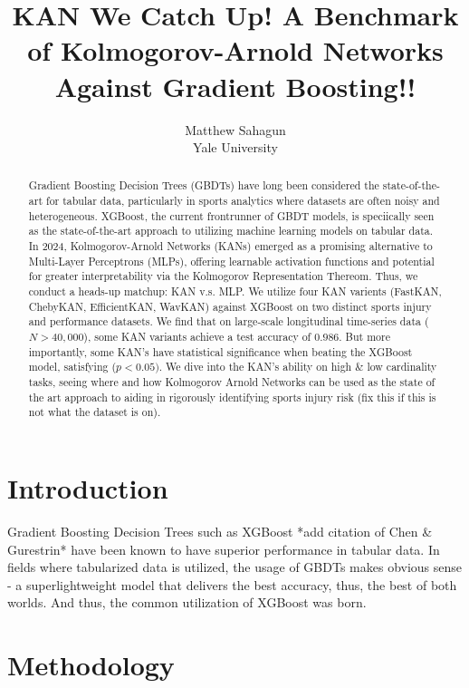 \documentclass{article} %
\title{KAN We Catch Up! A Benchmark of Kolmogorov-Arnold Networks Against Gradient Boosting!!}
\author{\name Matthew Sahagun \\
      \addr Yale University}
\begin{document}
\maketitle

\begin{abstract}
Gradient Boosting Decision Trees (GBDTs) have long been considered the state-of-the-art for tabular data, particularly in sports analytics where datasets are often noisy and heterogeneous. XGBoost, the current frontrunner of GBDT models, is speciically seen as the state-of-the-art approach to utilizing machine learning models on tabular data.  In 2024, Kolmogorov-Arnold Networks (KANs) emerged as a promising alternative to Multi-Layer Perceptrons (MLPs), offering learnable activation functions and potential for greater interpretability via the Kolmogorov Representation Thereom. Thus, we conduct a heads-up matchup: KAN v.s. MLP. We utilize four KAN varients (FastKAN, ChebyKAN, EfficientKAN, WavKAN) against XGBoost on two distinct sports injury and performance datasets. We find that on large-scale longitudinal time-series data ($N>40,000$), some KAN variants achieve a test accuracy of $0.986$. But more importantly, some KAN's have statistical significance when beating the XGBoost model, satisfying ($p < 0.05)$. We dive into the KAN's ability on high \& low cardinality tasks, seeing where and how Kolmogorov Arnold Networks can be used as the state of the art approach to aiding in rigorously identifying sports injury risk (fix this if this is not what the dataset is on).
\end{abstract}

\section{Introduction}
Gradient Boosting Decision Trees such as XGBoost *add citation of Chen \& Gurestrin* have been known to have superior performance in tabular data. In fields where tabularized
data is utilized, the usage of GBDTs makes obvious sense - a superlightweight model that delivers the best accuracy, thus, the best of both worlds. And thus, the common utilization of XGBoost
was born. 


\section{Methodology}
\end{document}
